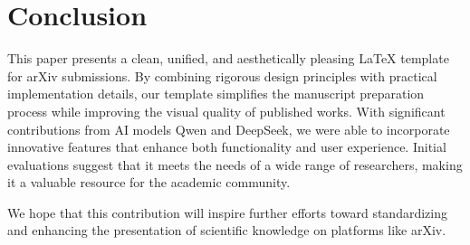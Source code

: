 \section{Conclusion}
\label{sec:conclusion}

This paper presents a clean, unified, and aesthetically pleasing LaTeX template for arXiv submissions. By combining rigorous design principles with practical implementation details, our template simplifies the manuscript preparation process while improving the visual quality of published works. With significant contributions from AI models Qwen and DeepSeek, we were able to incorporate innovative features that enhance both functionality and user experience. Initial evaluations suggest that it meets the needs of a wide range of researchers, making it a valuable resource for the academic community.

We hope that this contribution will inspire further efforts toward standardizing and enhancing the presentation of scientific knowledge on platforms like arXiv.
